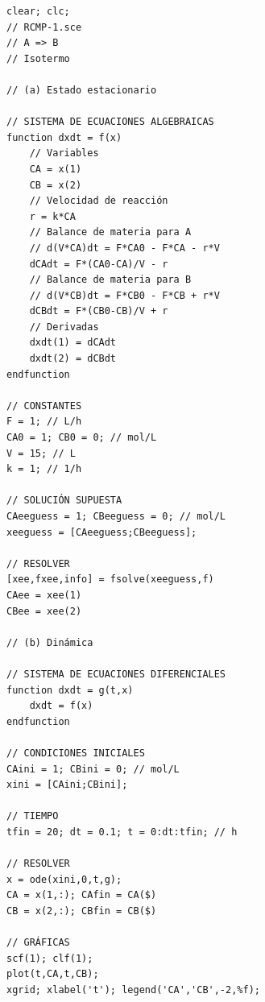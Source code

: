 \begin{verbatim}
clear; clc; 
// RCMP-1.sce
// A => B
// Isotermo

// (a) Estado estacionario

// SISTEMA DE ECUACIONES ALGEBRAICAS
function dxdt = f(x)
    // Variables
    CA = x(1)
    CB = x(2)
    // Velocidad de reacción
    r = k*CA
    // Balance de materia para A
    // d(V*CA)dt = F*CA0 - F*CA - r*V
    dCAdt = F*(CA0-CA)/V - r
    // Balance de materia para B
    // d(V*CB)dt = F*CB0 - F*CB + r*V
    dCBdt = F*(CB0-CB)/V + r
    // Derivadas
    dxdt(1) = dCAdt
    dxdt(2) = dCBdt
endfunction

// CONSTANTES
F = 1; // L/h
CA0 = 1; CB0 = 0; // mol/L
V = 15; // L
k = 1; // 1/h

// SOLUCIÓN SUPUESTA
CAeeguess = 1; CBeeguess = 0; // mol/L
xeeguess = [CAeeguess;CBeeguess];

// RESOLVER
[xee,fxee,info] = fsolve(xeeguess,f)
CAee = xee(1)
CBee = xee(2)

// (b) Dinámica

// SISTEMA DE ECUACIONES DIFERENCIALES
function dxdt = g(t,x)
    dxdt = f(x)
endfunction

// CONDICIONES INICIALES
CAini = 1; CBini = 0; // mol/L
xini = [CAini;CBini];

// TIEMPO
tfin = 20; dt = 0.1; t = 0:dt:tfin; // h

// RESOLVER
x = ode(xini,0,t,g);
CA = x(1,:); CAfin = CA($)
CB = x(2,:); CBfin = CB($)

// GRÁFICAS
scf(1); clf(1);
plot(t,CA,t,CB);
xgrid; xlabel('t'); legend('CA','CB',-2,%f);
\end{verbatim}

